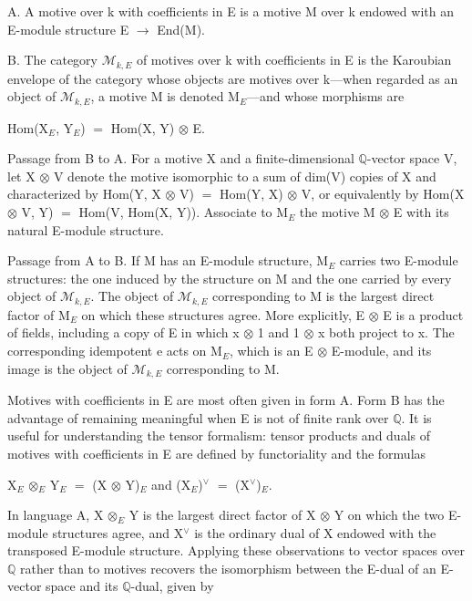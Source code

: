 \documentclass[10pt,twoside]{article}
\begin{document}
A. A motive over k with coefficients in E is a motive M over k endowed with an E-module structure E \ensuremath{→} End(M).\par
B. The category \ensuremath{ℳ}\ensuremath{_{k,E}} of motives over k with coefficients in E is the Karoubian envelope of the category whose objects are motives over k—when regarded as an object of \ensuremath{ℳ}\ensuremath{_{k,E}}, a motive M is denoted M\ensuremath{_{E}}—and whose morphisms are\par
Hom(X\ensuremath{_{E}}, Y\ensuremath{_{E}}) \ensuremath{=} Hom(X, Y) \ensuremath{⊗} E.\par
Passage from B to A. For a motive X and a finite-dimensional \ensuremath{ℚ}-vector space V, let X \ensuremath{⊗} V denote the motive isomorphic to a sum of dim(V) copies of X and characterized by Hom(Y, X \ensuremath{⊗} V) \ensuremath{=} Hom(Y, X) \ensuremath{⊗} V, or equivalently by Hom(X \ensuremath{⊗} V, Y) \ensuremath{=} Hom(V, Hom(X, Y)). Associate to M\ensuremath{_{E}} the motive M \ensuremath{⊗} E with its natural E-module structure.\par
Passage from A to B. If M has an E-module structure, M\ensuremath{_{E}} carries two E-module structures: the one induced by the structure on M and the one carried by every object of \ensuremath{ℳ}\ensuremath{_{k,E}}. The object of \ensuremath{ℳ}\ensuremath{_{k,E}} corresponding to M is the largest direct factor of M\ensuremath{_{E}} on which these structures agree. More explicitly, E \ensuremath{⊗} E is a product of fields, including a copy of E in which x \ensuremath{⊗} 1 and 1 \ensuremath{⊗} x both project to x. The corresponding idempotent e acts on M\ensuremath{_{E}}, which is an E \ensuremath{⊗} E-module, and its image is the object of \ensuremath{ℳ}\ensuremath{_{k,E}} corresponding to M.\par
Motives with coefficients in E are most often given in form A. Form B has the advantage of remaining meaningful when E is not of finite rank over \ensuremath{ℚ}. It is useful for understanding the tensor formalism: tensor products and duals of motives with coefficients in E are defined by functoriality and the formulas\par
X\ensuremath{_{E}} \ensuremath{⊗}\ensuremath{_{E}} Y\ensuremath{_{E}} \ensuremath{=} (X \ensuremath{⊗} Y)\ensuremath{_{E}} and (X\ensuremath{_{E}})\ensuremath{^{∨}} \ensuremath{=} (X\ensuremath{^{∨}})\ensuremath{_{E}}.\par
In language A, X \ensuremath{⊗}\ensuremath{_{E}} Y is the largest direct factor of X \ensuremath{⊗} Y on which the two E-module structures agree, and X\ensuremath{^{∨}} is the ordinary dual of X endowed with the transposed E-module structure. Applying these observations to vector spaces over \ensuremath{ℚ} rather than to motives recovers the isomorphism between the E-dual of an E-vector space and its \ensuremath{ℚ}-dual, given by\par
\end{document}
